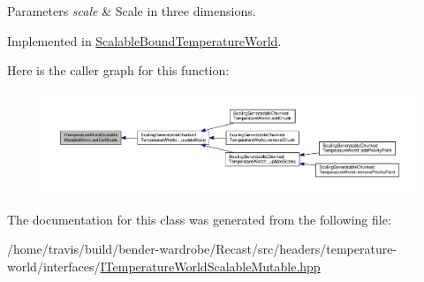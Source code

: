 \begin{DoxyParams}{Parameters}
{\em scale} & Scale in three dimensions. \\
\hline
\end{DoxyParams}


Implemented in \hyperlink{class_scalable_bound_temperature_world_addf3187d106391375b4453614a84563b}{Scalable\-Bound\-Temperature\-World}.



Here is the caller graph for this function\-:
\nopagebreak
\begin{figure}[H]
\begin{center}
\leavevmode
\includegraphics[width=350pt]{class_i_temperature_world_scalable_mutable_mixin_a570d17e46a6b97d7ab6c0b7512603a4d_icgraph}
\end{center}
\end{figure}




The documentation for this class was generated from the following file\-:\begin{DoxyCompactItemize}
\item 
/home/travis/build/bender-\/wardrobe/\-Recast/src/headers/temperature-\/world/interfaces/\hyperlink{_i_temperature_world_scalable_mutable_8hpp}{I\-Temperature\-World\-Scalable\-Mutable.\-hpp}\end{DoxyCompactItemize}
